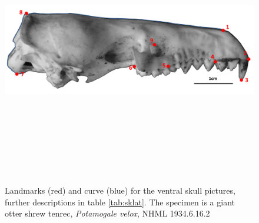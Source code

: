 \documentclass[12pt,a4paper]{article}
\begin{document}
\begin{figure}[H] 
  \centering
  \includegraphics[width=12cm, height=12cm, keepaspectratio=true]
  {figures/sklat_landmarks_pot_vel.png}
    \caption {Landmarks (red) and curve (blue) for the ventral skull pictures, further descriptions in table \ref{tab:sklat}. The specimen is a giant otter shrew tenrec, \textit{Potamogale velox}, NHML 1934.6.16.2}
  \label{fig:sklat_landmarks}
  \end{figure}


\begin{table}[h]
\caption{Descriptions of the landmarks (points) and curves (semilandmarks) for the skulls in ventral view (see Figure \ref{fig:sklat_landmarks}.} 

\label{tab:sklat}
\end{table}
\end{document}
